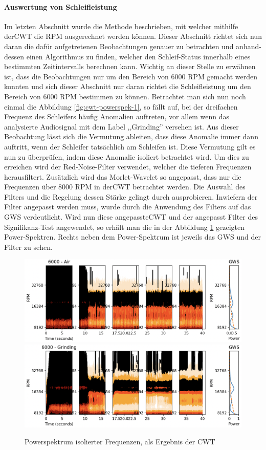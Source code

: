 \paragraph{Auswertung von Schleifleistung}
Im letzten Abschnitt wurde die Methode beschrieben, mit welcher mithilfe der\ac{CWT} die RPM ausgerechnet werden können. Dieser Abschnitt richtet sich nun daran die dafür aufgetretenen Beobachtungen genauer zu betrachten und anhand-dessen einen Algorithmus zu finden, welcher den Schleif-Status innerhalb eines bestimmten Zeitintervalls berechnen kann. Wichtig an dieser Stelle zu erwähnen ist, dass die Beobachtungen nur um den Bereich von 6000 RPM gemacht werden konnten und sich dieser Abschnitt nur daran richtet die Schleifleistung um den Bereich von 6000 RPM bestimmen zu können. Betrachtet man sich nun noch einmal die Abbildung \ref{fig:cwt-powerspek-1}, so fällt auf, bei der dreifachen Frequenz des Schleifers häufig Anomalien auftreten, vor allem wenn das analysierte Audiosignal mit dem Label ,,Grinding'' versehen ist. Aus dieser Beobachtung lässt sich die Vermutung ableiten, dass diese Anomalie immer dann auftritt, wenn der Schleifer tatsächlich am Schleifen ist. Diese Vermutung gilt es nun zu überprüfen, indem diese Anomalie isoliert betrachtet wird. Um dies zu erreichen wird der Red-Noise-Filter verwendet, welcher die tieferen Frequenzen herausfiltert. Zusätzlich wird das Morlet-Wavelet so angepasst, dass nur die Frequenzen über 8000 RPM in der\ac{CWT} betrachtet werden. Die Auswahl des Filters und die Regelung dessen Stärke gelingt durch ausprobieren. Inwiefern der Filter angepasst werden muss, wurde durch die Anwendung des Filters auf das GWS verdeutlicht. Wird nun diese angepasste\ac{CWT} und der angepasst Filter des Signifikanz-Test angewendet, so erhält man die in der Abbildung \ref{fig:cwt-powerspek-2} gezeigten Power-Spektren. Rechts neben dem Power-Spektrum ist jeweils das GWS und der Filter zu sehen.

\begin{figure}[H]
    \centering
    \includegraphics[width=0.8\linewidth]{Studienarbeit//images/cwt-iso-6000-air.png}    
    \includegraphics[width=0.8\linewidth]{Studienarbeit//images/cwt-iso-6000-grinding.png}   
    \caption{Powerspektrum isolierter Frequenzen, als Ergebnis der CWT}
    \label{fig:cwt-powerspek-2}
\end{figure}


